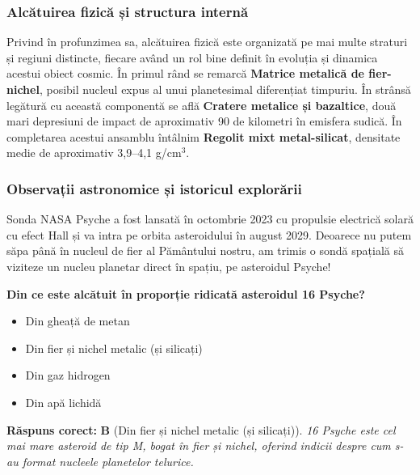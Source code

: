 \subsubsection*{Alcătuirea fizică și structura internă}
Privind în profunzimea sa, alcătuirea fizică este organizată pe mai multe straturi și regiuni distincte, fiecare având un rol bine definit în evoluția și dinamica acestui obiect cosmic. În primul rând se remarcă \textbf{Matrice metalică de fier-nichel}, posibil nucleul expus al unui planetesimal diferențiat timpuriu. În strânsă legătură cu această componentă se află \textbf{Cratere metalice și bazaltice}, două mari depresiuni de impact de aproximativ 90 de kilometri în emisfera sudică. În completarea acestui ansamblu întâlnim \textbf{Regolit mixt metal-silicat}, densitate medie de aproximativ 3,9--4,1 g/cm$^3$.

\subsubsection*{Observații astronomice și istoricul explorării}
Sonda NASA Psyche a fost lansată în octombrie 2023 cu propulsie electrică solară cu efect Hall și va intra pe orbita asteroidului în august 2029. Deoarece nu putem săpa până în nucleul de fier al Pământului nostru, am trimis o sondă spațială să viziteze un nucleu planetar direct în spațiu, pe asteroidul Psyche!

\vspace{6pt}
\begin{tcolorbox}[orbitarquiz, title={\textbf{Întrebare de verificare \#40: 16 Psyche}}]
\textbf{Din ce este alcătuit în proporție ridicată asteroidul 16 Psyche?}
\begin{itemize}[leftmargin=2.2em, itemsep=2pt, topsep=4pt]
  \item[$\square$ \textbf{A.}] Din gheață de metan
  \item[$\square$ \textbf{B.}] Din fier și nichel metalic (și silicați)
  \item[$\square$ \textbf{C.}] Din gaz hidrogen
  \item[$\square$ \textbf{D.}] Din apă lichidă
\end{itemize}
\vspace{2pt}
{\footnotesize\color{orbitarMuted}\textbf{Răspuns corect:} \textbf{B} (Din fier și nichel metalic (și silicați)). \emph{16 Psyche este cel mai mare asteroid de tip M, bogat în fier și nichel, oferind indicii despre cum s-au format nucleele planetelor telurice.}}
\end{tcolorbox}
\clearpage


